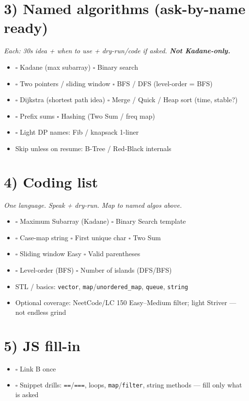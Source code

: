 \documentclass[a4paper,9pt]{extarticle}
\newcommand{\tag}[1]{\textcolor{muted}{\small\textit{#1}}}
\begin{document}
\section{3) Named algorithms (ask-by-name ready)}
\tag{Each: 30s idea + when to use + dry-run/code if asked. \textbf{Not Kadane-only.}}
\begin{itemize}
  \item $\square$ Kadane (max subarray) \quad $\square$ Binary search
  \item $\square$ Two pointers / sliding window \quad $\square$ BFS / DFS (level-order = BFS)
  \item $\square$ Dijkstra (shortest path idea) \quad $\square$ Merge / Quick / Heap sort (time, stable?)
  \item $\square$ Prefix sums \quad $\square$ Hashing (Two Sum / freq map)
  \item $\square$ Light DP names: Fib / knapsack 1-liner
  \item Skip unless on resume: B-Tree / Red-Black internals
\end{itemize}

\section{4) Coding list}
\tag{One language. Speak + dry-run. Map to named algos above.}
\begin{itemize}
  \item $\square$ Maximum Subarray (Kadane) \quad $\square$ Binary Search template
  \item $\square$ Case-map string \quad $\square$ First unique char \quad $\square$ Two Sum
  \item $\square$ Sliding window Easy \quad $\square$ Valid parentheses
  \item $\square$ Level-order (BFS) \quad $\square$ Number of islands (DFS/BFS)
  \item STL / basics: \texttt{vector}, \texttt{map}/\texttt{unordered\_map}, \texttt{queue}, \texttt{string}
  \item Optional coverage: NeetCode/LC 150 Easy--Medium filter; light Striver --- not endless grind
\end{itemize}

\section{5) JS fill-in}
\begin{itemize}
  \item $\square$ Link B once
  \item $\square$ Snippet drills: \texttt{==}/\texttt{===}, loops, \texttt{map}/\texttt{filter}, string methods --- fill only what is asked
\end{itemize}
\end{document}
